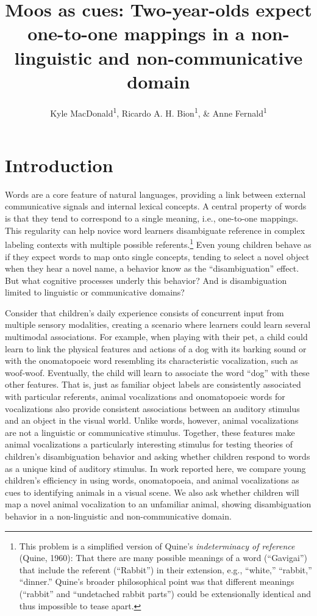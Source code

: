 \documentclass[english,floatsintext,man]{apa6}
\title{Moos as cues: Two-year-olds expect one-to-one mappings in a
non-linguistic and non-communicative domain}
\author{Kyle MacDonald\textsuperscript{1}, Ricardo A. H. Bion\textsuperscript{1}, \& Anne Fernald\textsuperscript{1}}
\affiliation{
    \vspace{0.5cm}
          \textsuperscript{1} Stanford University  }
\theoremstyle{definition}
\theoremstyle{definition}
\theoremstyle{definition}
\theoremstyle{remark}
\begin{document}
\maketitle

\setcounter{secnumdepth}{0}



\hypertarget{introduction}{%
\section{Introduction}\label{introduction}}

Words are a core feature of natural languages, providing a link between
external communicative signals and internal lexical concepts. A central
property of words is that they tend to correspond to a single meaning,
i.e., one-to-one mappings. This regularity can help novice word learners
disambiguate reference in complex labeling contexts with multiple
possible referents.\footnote{This problem is a simplified version of
  Quine's \textit{indeterminacy of reference} (Quine, 1960): That there
  are many possible meanings of a word (\enquote{Gavigai}) that include
  the referent (\enquote{Rabbit}) in their extension, e.g.,
  \enquote{white,} \enquote{rabbit,} \enquote{dinner.} Quine's broader
  philosophical point was that different meanings (\enquote{rabbit} and
  \enquote{undetached rabbit parts}) could be extensionally identical
  and thus impossible to tease apart.} Even young children behave as if
they expect words to map onto single concepts, tending to select a novel
object when they hear a novel name, a behavior know as the
\enquote{disambiguation} effect. But what cognitive processes underly
this behavior? And is disambiguation limited to linguistic or
communicative domains?

Consider that children's daily experience consists of concurrent input
from multiple sensory modalities, creating a scenario where learners
could learn several multimodal associations. For example, when playing
with their pet, a child could learn to link the physical features and
actions of a dog with its barking sound or with the onomatopoeic word
resembling its characteristic vocalization, such as woof-woof.
Eventually, the child will learn to associate the word \enquote{dog}
with these other features. That is, just as familiar object labels are
consistently associated with particular referents, animal vocalizations
and onomatopoeic words for vocalizations also provide consistent
associations between an auditory stimulus and an object in the visual
world. Unlike words, however, animal vocalizations are not a linguistic
or communicative stimulus. Together, these features make animal
vocalizations a particularly interesting stimulus for testing theories
of children's disambiguation behavior and asking whether children
respond to words as a unique kind of auditory stimulus. In work reported
here, we compare young children's efficiency in using words,
onomatopoeia, and animal vocalizations as cues to identifying animals in
a visual scene. We also ask whether children will map a novel animal
vocalization to an unfamiliar animal, showing disambiguation behavior in
a non-linguistic and non-communicative domain.
\end{document}
